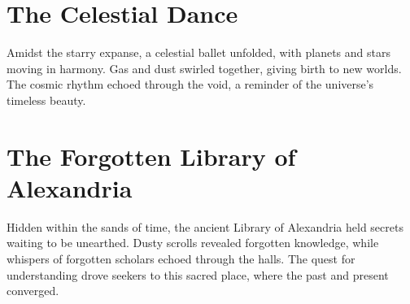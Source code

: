 \documentclass[12pt]{article}
\begin{document}
\thispagestyle{fancy}
\pagestyle{fancy}

\section{The Celestial Dance}
Amidst the starry expanse, a celestial ballet unfolded, with planets and stars moving in harmony. Gas and dust swirled together, giving birth to new worlds. The cosmic rhythm echoed through the void, a reminder of the universe's timeless beauty.

\section{The Forgotten Library of Alexandria}
Hidden within the sands of time, the ancient Library of Alexandria held secrets waiting to be unearthed. Dusty scrolls revealed forgotten knowledge, while whispers of forgotten scholars echoed through the halls. The quest for understanding drove seekers to this sacred place, where the past and present converged.
\end{document}
